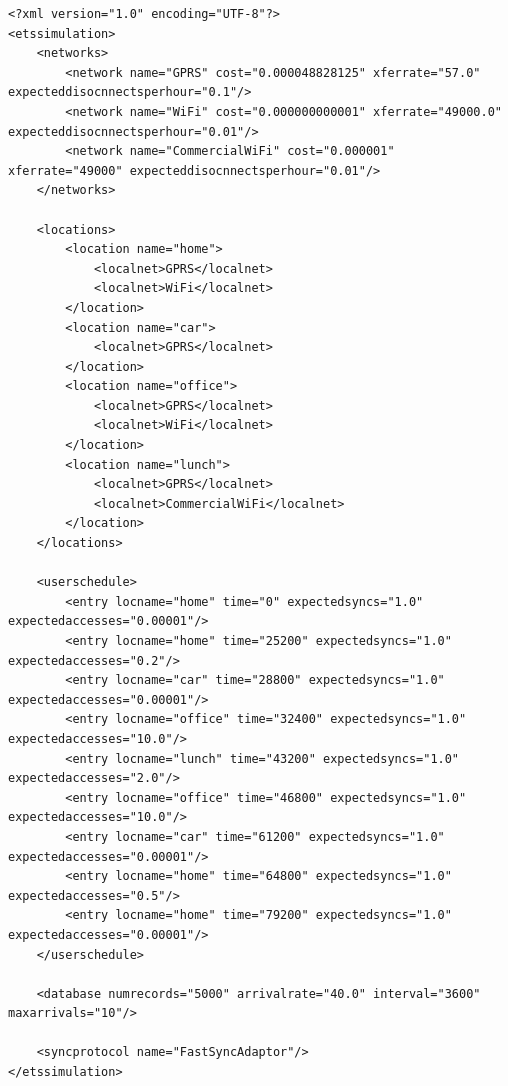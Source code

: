 \begin{lstlisting}
<?xml version="1.0" encoding="UTF-8"?>
<etssimulation>
	<networks>
		<network name="GPRS" cost="0.000048828125" xferrate="57.0" expecteddisocnnectsperhour="0.1"/>
		<network name="WiFi" cost="0.000000000001" xferrate="49000.0" expecteddisocnnectsperhour="0.01"/>
		<network name="CommercialWiFi" cost="0.000001" xferrate="49000" expecteddisocnnectsperhour="0.01"/>
	</networks>

	<locations>
		<location name="home">
			<localnet>GPRS</localnet>
			<localnet>WiFi</localnet>
		</location>
		<location name="car">
			<localnet>GPRS</localnet>
		</location>
		<location name="office">
			<localnet>GPRS</localnet>
			<localnet>WiFi</localnet>
		</location>
		<location name="lunch">
			<localnet>GPRS</localnet>
			<localnet>CommercialWiFi</localnet>
		</location>
	</locations>

	<userschedule>
		<entry locname="home" time="0" expectedsyncs="1.0" expectedaccesses="0.00001"/>
		<entry locname="home" time="25200" expectedsyncs="1.0" expectedaccesses="0.2"/>		
		<entry locname="car" time="28800" expectedsyncs="1.0" expectedaccesses="0.00001"/>
		<entry locname="office" time="32400" expectedsyncs="1.0" expectedaccesses="10.0"/>
		<entry locname="lunch" time="43200" expectedsyncs="1.0" expectedaccesses="2.0"/>
		<entry locname="office" time="46800" expectedsyncs="1.0" expectedaccesses="10.0"/>
		<entry locname="car" time="61200" expectedsyncs="1.0" expectedaccesses="0.00001"/>
		<entry locname="home" time="64800" expectedsyncs="1.0" expectedaccesses="0.5"/>		
		<entry locname="home" time="79200" expectedsyncs="1.0" expectedaccesses="0.00001"/>				
	</userschedule>

	<database numrecords="5000" arrivalrate="40.0" interval="3600" maxarrivals="10"/>

	<syncprotocol name="FastSyncAdaptor"/>
</etssimulation>
\end{lstlisting}

